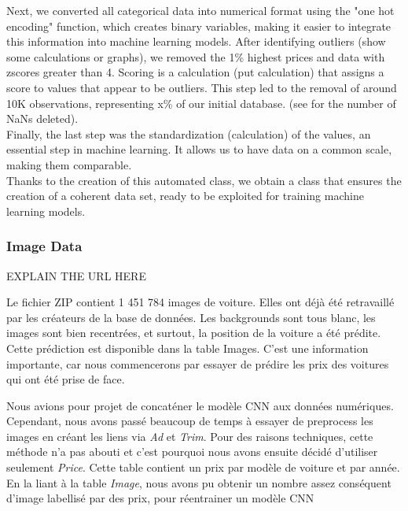 \documentclass[12pt]{article}
\begin{document}
\noindent Next, we converted all categorical data into numerical format using the "one hot encoding" function, which creates binary variables, making it easier to integrate this information into machine learning models. After identifying outliers (show some calculations or graphs), we removed the 1\% highest prices and data with zscores greater than 4. Scoring is a calculation (put calculation) that assigns a score to values that appear to be outliers. This step led to the removal of around 10K observations, representing x\% of our initial database. (see for the number of NaNs deleted).\\

\noindent Finally, the last step was the standardization (calculation) of the values, an essential step in machine learning. It allows us to have data on a common scale, making them comparable. \\

\noindent Thanks to the creation of this automated class, we obtain a class that ensures the creation of a coherent data set, ready to be exploited for training machine learning models. \\



\subsubsection{Image Data}

EXPLAIN THE URL HERE


Le fichier ZIP contient 1 451 784 images de voiture. Elles ont déjà été retravaillé par les créateurs de la base de données. Les backgrounds sont tous blanc, les images sont bien recentrées, et surtout, la position de la voiture a été prédite. Cette prédiction est disponible dans la table Images. C’est une information importante, car nous commencerons par essayer de prédire les prix des voitures qui ont été prise de face.


\noindent Nous avions pour projet de concaténer le modèle CNN aux données numériques. Cependant, nous avons passé beaucoup de temps à essayer de preprocess les images en créant les liens via \textit{Ad} et \textit{Trim}. Pour des raisons techniques, cette méthode n'a pas abouti et c'est pourquoi nous avons ensuite décidé d'utiliser seulement \textit{Price}. Cette table contient un prix par modèle de voiture et par année. En la liant à la table \textit{Image}, nous avons pu obtenir un nombre assez conséquent d'image labellisé par des prix, pour réentrainer un modèle CNN
\end{document}
